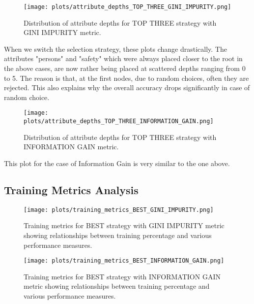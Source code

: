 \documentclass[12pt]{article}
\begin{document}
\begin{figure}[H]
    \centering
    \texttt{[image: plots/attribute\_depths\_TOP\_THREE\_GINI\_IMPURITY.png]}
    \caption{Distribution of attribute depths for TOP THREE strategy with GINI IMPURITY metric.}
    \label{fig:attr-top3-gini}
\end{figure}

When we switch the selection strategy, these plots change drastically. The attributes "persons" and "safety" which were always placed closer to the root in the above cases, are now rather being placed at scattered depths ranging from 0 to 5. The reason is that, at the first nodes, due to random choices, often they are rejected. This also explains why the overall accuracy drops significantly in case of random choice.

\newpage

\begin{figure}[H]
    \centering
    \texttt{[image: plots/attribute\_depths\_TOP\_THREE\_INFORMATION\_GAIN.png]}
    \caption{Distribution of attribute depths for TOP THREE strategy with INFORMATION GAIN metric.}
    \label{fig:attr-top3-ig}
\end{figure}

This plot for the case of Information Gain is very similar to the one above.

\newpage

\subsection{Training Metrics Analysis}

\begin{figure}[H]
    \centering
    \texttt{[image: plots/training\_metrics\_BEST\_GINI\_IMPURITY.png]}
    \caption{Training metrics for BEST strategy with GINI IMPURITY metric showing relationships between training percentage and various performance measures.}
    \label{fig:training-best-gini}
\end{figure}
\newpage

\begin{figure}[H]
    \centering
    \texttt{[image: plots/training\_metrics\_BEST\_INFORMATION\_GAIN.png]}
    \caption{Training metrics for BEST strategy with INFORMATION GAIN metric showing relationships between training percentage and various performance measures.}
    \label{fig:training-best-ig}
\end{figure}
\newpage
\end{document}
